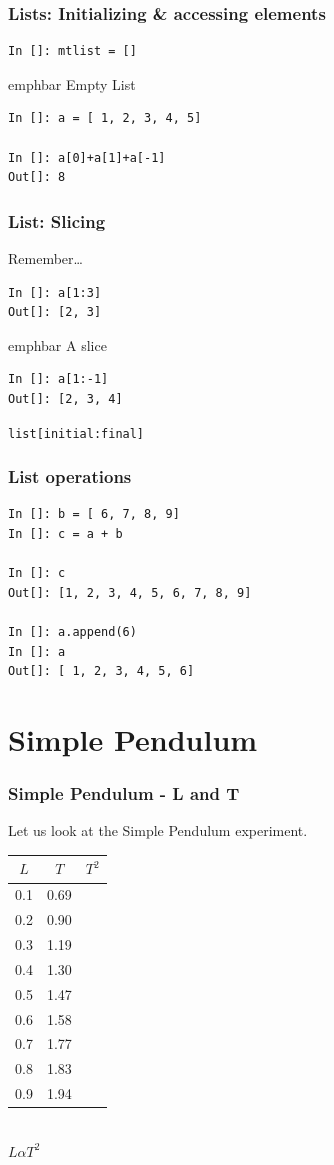 \documentclass[14pt,compress]{beamer}
\newcommand{\emphbar}[1]
{\begin{beamercolorbox}[rounded=true]{emphbar} 
      {#1}
 \end{beamercolorbox}
}
\newcounter{time}
\newcommand{\inctime}[1]{\addtocounter{time}{#1}{\tiny \thetime\ m}}
\newcommand{\typ}[1]{\lstinline{#1}}
\newcommand{\kwrd}[1]{ \texttt{\textbf{\color{blue}{#1}}}  }
\begin{document}
\begin{frame}[fragile]
\frametitle{Lists: Initializing \& accessing elements}
\begin{lstlisting}
In []: mtlist = [] 
\end{lstlisting}
\emphbar{Empty List}
\begin{lstlisting}
In []: a = [ 1, 2, 3, 4, 5] 

In []: a[0]+a[1]+a[-1]
Out[]: 8
\end{lstlisting}
\end{frame}

\begin{frame}[fragile]
  \frametitle{List: Slicing}
  \begin{block}{Remember\ldots}
	\kwrd{In []: a = [ 1, 2, 3, 4, 5]}
  \end{block}
\begin{lstlisting}
In []: a[1:3]
Out[]: [2, 3]
\end{lstlisting}
\emphbar{A slice}
\begin{lstlisting}
In []: a[1:-1]
Out[]: [2, 3, 4]
\end{lstlisting}
\alert{\typ{list[initial:final]}}
\end{frame}

\begin{frame}[fragile]
\frametitle{List operations}
\begin{lstlisting}
In []: b = [ 6, 7, 8, 9]
In []: c = a + b

In []: c
Out[]: [1, 2, 3, 4, 5, 6, 7, 8, 9]

In []: a.append(6)
In []: a
Out[]: [ 1, 2, 3, 4, 5, 6]
\end{lstlisting}
\end{frame}

\section{Simple Pendulum}
\begin{frame}[fragile]
\frametitle{Simple Pendulum - L and T}
Let us look at the Simple Pendulum experiment.
\begin{center}
\begin{small}
\begin{tabular}{| c | c | c |}
\hline
$L$ & $T$ & $T^2$ \\ \hline
0.1 & 0.69 & \\ \hline
0.2 & 0.90 & \\ \hline
0.3 & 1.19 & \\ \hline
0.4 & 1.30 & \\ \hline
0.5 & 1.47 & \\ \hline
0.6 & 1.58 & \\ \hline
0.7 & 1.77 & \\ \hline
0.8 & 1.83 & \\ \hline
0.9 & 1.94 & \\ \hline
\end{tabular}
\end{small}\\
\alert{$L \alpha T^2$}
\end{center}
\end{frame}
\end{document}
